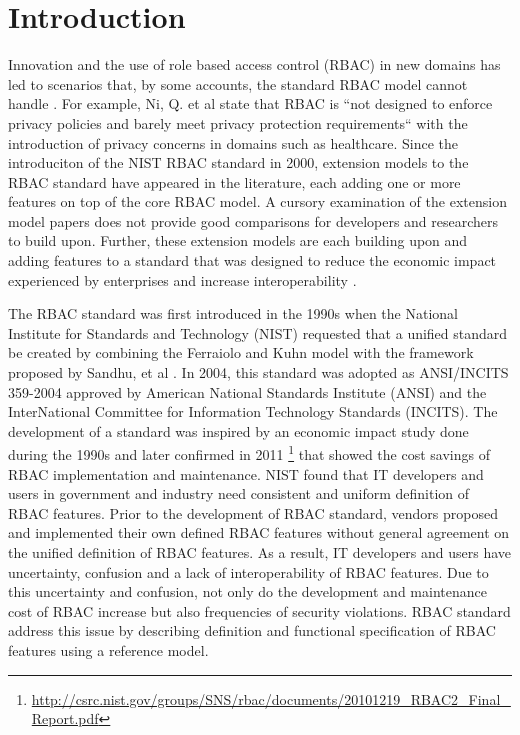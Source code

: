 \section{Introduction} \label{sec:introduction}

Innovation and the use of role based access control (RBAC) in new domains has led to scenarios that, by some accounts, the standard RBAC model cannot handle \cite{kuhn2010adding}.  
For example, Ni, Q. et al \cite{ni2010privacy} state that RBAC is ``not designed to enforce privacy policies and barely 
meet privacy protection requirements`` with the introduction of privacy concerns in domains such as healthcare. 
Since the introduciton of the NIST RBAC standard in 2000, extension models to the RBAC standard have appeared in the literature, each adding one or more features on top of the core RBAC model. 
A cursory examination of the extension model papers does not provide good comparisons for developers and researchers to build upon. 
Further, these extension models are each building upon and adding features to a standard that was designed to reduce the economic impact experienced by enterprises and increase interoperability \cite{o20102010}.

The RBAC standard was first introduced in the 1990s when the National Institute for Standards and Technology (NIST) 
requested that a unified standard be created by combining the Ferraiolo and Kuhn model \cite{ferraiolokuhn} with the framework 
proposed by Sandhu, et al \cite{sandhu1996role}.  
In 2004, this standard was adopted as ANSI/INCITS 359-2004 approved by American National Standards Institute (ANSI) and the InterNational Committee for Information Technology Standards (INCITS). 
The development of a standard was inspired by an economic impact study done during the 1990s and later confirmed in 2011 \footnote{\url{http://csrc.nist.gov/groups/SNS/rbac/documents/20101219_RBAC2_Final_Report.pdf}} that showed the cost savings of RBAC implementation and maintenance.
NIST found that IT developers and users in government and industry need consistent and uniform definition of RBAC features. 
Prior to the development of RBAC standard, vendors proposed and implemented their own defined RBAC features without general agreement on the unified definition of RBAC features. 
As a result, IT developers and users have uncertainty, confusion and a lack of interoperability of RBAC features. 
Due to this uncertainty and confusion, not only do the development and maintenance cost of RBAC increase but also frequencies of security violations.
RBAC standard address this issue by describing definition and functional specification of RBAC features using a reference model.

